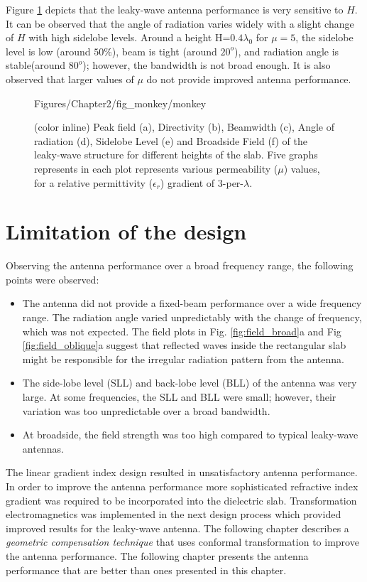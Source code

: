 Figure \ref{fig:char_grad} depicts that the leaky-wave antenna performance is very sensitive to $H$. It can be observed that the angle of radiation varies widely with a slight change of $H$ with high sidelobe levels. Around a height H=$0.4 \lambda_0$ for $\mu = 5$, the sidelobe level is low (around $50\%$), beam is tight (around $20^o$), and radiation angle is stable(around $80^o$); however, the bandwidth is not broad enough. It is also observed that larger values of $\mu$ do not provide improved antenna performance. 

\begin{figure} [p!]
	\centering
	\noindent
	\begin{overpic}[trim={0cm 0 1cm 0cm},clip,scale=0.5, keepaspectratio=true]{Figures/Chapter2/fig_monkey/monkey}
	\end{overpic}
	
	\caption[Characterization of the leaky-wave antenna having a gradient index slab.]{(color inline) Peak field (a), Directivity (b), Beamwidth (c), Angle of radiation (d), Sidelobe Level (e) and Broadside Field (f) of the leaky-wave structure for different heights of the slab. Five graphs represents in each plot represents various permeability ($\mu$) values, for a relative permittivity ($\epsilon_r$) gradient of $3$-per-$\lambda$. }
	\label{fig:char_grad}
\end{figure}

\section{Limitation of the design}
Observing the antenna performance over a broad frequency range, the following points were observed:
\begin{itemize}
    \item The antenna did not provide a fixed-beam performance over a wide frequency range. The radiation angle varied unpredictably with the change of frequency, which was not expected. The field plots in Fig. \ref{fig:field_broad}a and Fig \ref{fig:field_oblique}a suggest that reflected waves inside the rectangular slab might be responsible for the irregular radiation pattern from the antenna.
    \item The side-lobe level (SLL) and back-lobe level (BLL) of the antenna was very large. At some frequencies, the SLL and BLL were small; however, their variation was too unpredictable over a broad bandwidth.
    \item At broadside, the field strength was too high compared to typical leaky-wave antennas.
\end{itemize}

The linear gradient index design resulted in unsatisfactory antenna performance. In order to improve the antenna performance more sophisticated refractive index gradient was required to be incorporated into the dielectric slab. Transformation electromagnetics was implemented in the next design process which provided improved results for the leaky-wave antenna. The following chapter describes a \textit{geometric compensation technique} that uses conformal transformation to improve the antenna performance. The following chapter presents the antenna performance that are better than ones presented in this chapter.
